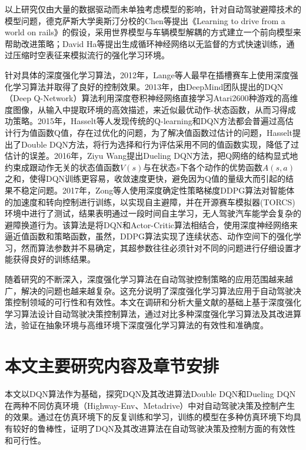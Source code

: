 以上研究仅由大量的数据驱动而未单独考虑模型的影响，针对自动驾驶避障技术的模型问题，德克萨斯大学奥斯汀分校的Chen等提出《Learning to drive from a world on rails》的假设\cite{2021Learning}，采用世界模型与车辆模型解耦的方式建立一个前向模型来帮助改进策略；David Ha等提出生成循环神经网络以无监督的方式快速训练，通过压缩时空表征来模拟流行的强化学习环境\cite{2018Recurrent}。

针对具体的深度强化学习算法，2012年，Lange等人最早在插槽赛车上使用深度强化学习算法并取得了良好的控制效果\cite{2012Autonomous}。2013年，由DeepMind团队提出的DQN（Deep Q-Network）算法利用深度卷积神经网络直接学习Atari2600种游戏的高维度图像，从输入中提取环境的高效描述，来近似最优动作-状态函数，从而习得成功策略\cite{2013DQN}。2015年，Hasselt等人发现传统的Q-learning和DQN方法都会普遍过高估计行为值函数Q值，存在过优化的问题，为了解决值函数过估计的问题，Hasselt提出了Double DQN方法，将行为选择和行为评估采用不同的值函数实现，降低了过估计的误差\cite{2015DDQN}。2016年，Ziyu Wang提出Dueling DQN方法，把Q网络的结构显式地约束成跟动作无关的状态值函数$V(s)$与在状态$s$下各个动作的优势函数$A(s,a)$之和，使得DQN训练更容易，收敛速度更快，避免因为Q值的量级大而引起的结果不稳定问题\cite{2016DuelingDQN}。2017年，Zong等人使用深度确定性策略梯度DDPG算法对智能体的加速度和转向控制进行训练，以实现自主避障，并在开源赛车模拟器(TORCS)环境中进行了测试，结果表明通过一段时间自主学习，无人驾驶汽车能学会复杂的避障换道行为\cite{2017Obstacle}。该算法是将DQN和Actor-Critic算法相结合，使用深度神经网络来逼近值函数和策略函数，虽然，DDPG算法实现了连续状态、动作空间下的强化学习，然而算法参数并不易确定，其超参数往往必须针对不同的问题进行仔细设置才能获得良好的训练结果。

随着研究的不断深入，深度强化学习算法在自动驾驶控制策略的应用范围越来越广，解决的问题也越来越复杂。这充分说明了深度强化学习算法应用于自动驾驶决策控制领域的可行性和有效性。本文在调研和分析大量文献的基础上基于深度强化学习算法设计自动驾驶决策控制算法，通过对比多种深度强化学习算法及其改进算法，验证在抽象环境与高维环境下深度强化学习算法的有效性和准确度。

\section{本文主要研究内容及章节安排} %

本文以DQN算法作为基础，探究DQN及其改进算法Double DQN和Dueling DQN在两种不同仿真环境（Highway-Env、Metadrive）中对自动驾驶决策及控制产生的效果。通过在仿真环境下的反复训练和学习，训练的模型在多种仿真环境下均具有较好的鲁棒性，证明了DQN及其改进算法在自动驾驶决策及控制方面的有效性和可行性。

